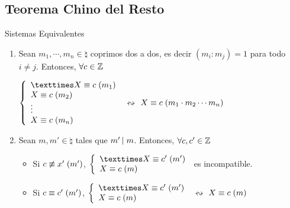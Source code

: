 \documentclass[10pt]{article}
\begin{document}
\begin{center}
\subsection{Teorema Chino del Resto} 
\end{center}


\begin{propo}{Sistemas Equivalentes}
 \begin{enumerate}
  \item Sean $m_1, \cdots , m_n \in \natural{}$ coprimos dos a dos, es decir $(m_i : m_j)=1$ para todo $i \neq j$. Entonces, $\forall c \in \entero{}$
  \begin{center}
  $\left\lbrace \begin{array}{l}
                × \congruente{X}{c}{m_1} \\
                  \congruente{X}{c}{m_2} \\
                  \vdots              \\
                  \congruente{X}{c}{m_n}
               \end{array}\right.$ $\leftrightsquigarrow$ $\congruente{X}{c}{m_1 \cdot m_2 \cdots m_n}$
  \end{center}
  \item Sean $m, m' \in \natural{}$ tales que $\divi{m'}{m}$. Entonces, $\forall c, c' \in \entero{}$
  \begin{itemize}
   \item Si $c \not\equiv x' \es{0.1}(m')$, $\left\lbrace \begin{array}{l}
                                                           ×\congruente{X}{c'}{m'} \\
                                                            \congruente{X}{c}{m} 
                                                          \end{array}\right.$ es incompatible. 
   \item Si $\congruente{c}{c'}{m'}$, $\left\lbrace \begin{array}{l}
                                                           ×\congruente{X}{c'}{m'} \\
                                                            \congruente{X}{c}{m} 
                                                          \end{array}\right.$ $\leftrightsquigarrow$ $\congruente{X}{c}{m}$
  \end{itemize}
 \end{enumerate}
\end{propo}
\end{document}
